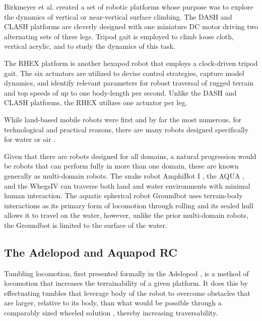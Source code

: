 		Birkmeyer et al. \cite{Birkmeyer2013} created a set of robotic platforms whose purpose was to explore the dynamics of vertical or near-vertical surface climbing. The DASH and CLASH platforms are cleverly designed with one miniature DC motor driving two alternating sets of three legs. Tripod gait is employed to climb loose cloth, vertical acrylic, and to study the dynamics of this task. 

		The RHEX platform \cite{Saranli2001a} is another hexapod robot that employs a clock-driven tripod gait. The six actuators are utilized to devise control strategies, capture model dynamics, and identify relevant parameters for robust traversal of rugged terrain and top speeds of up to one body-length per second. Unlike the DASH and CLASH platforms, the RHEX utilizes one actuator per leg. 

		While land-based mobile robots were first and by far the most numerous, for technological and practical reasons, there are many robots designed specifically for water \cite{Villanueva2013} \cite{Yu2018} or air \cite{Neumann2012} \cite{Morton2013}.  
		
		Given that there are robots designed for all domains, a natural progression would be robots that can perform fully in more than one domain, these are known generally as multi-domain robots. The snake robot AmphiBot I \cite{Crespi2005a}, the AQUA \cite{Dudek2007}, and the Whegs\texttrademark IV \cite{Boxerbaum2005} can traverse both land and water environments with minimal human interaction. The aquatic spherical robot Groundbot \cite{Kaznov2010} uses terrain-body interactions as its primary form of locomotion through rolling and its sealed hull allows it to travel on the water, however, unlike the prior multi-domain robots, the Groundbot is limited to the surface of the water.

	
	\subsection{The Adelopod and Aquapod RC}
	\label{sec:adelopod_aquapodrc}


		Tumbling locomotion, first presented formally in the Adelopod \cite{Hemes2009}, is a method of locomotion that increases the terrainability of a given platform. It does this by effectuating tumbles that leverage body of the robot to overcome obstacles that are larger, relative to its body, than what would be possible through a comparably sized wheeled solution \cite{Hemes2011}, thereby increasing traversability. 


